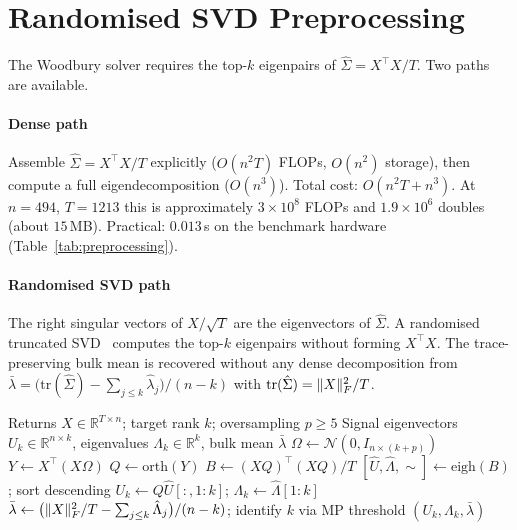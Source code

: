 \section{Randomised SVD Preprocessing}\label{sec:preprocessing}

The Woodbury solver requires the top-$k$ eigenpairs of $\hat\Sigma = X^\top X/T$.
Two paths are available.

\paragraph{Dense path}
Assemble $\hat\Sigma = X^\top X/T$ explicitly ($O(n^2 T)$ FLOPs, $O(n^2)$ storage),
then compute a full eigendecomposition ($O(n^3)$). Total cost: $O(n^2 T + n^3)$.
At $n = 494$, $T = 1213$ this is approximately $3 \times 10^8$ FLOPs and
$1.9 \times 10^6$ doubles (about $15$\,MB). Practical: $0.013$\,s on the benchmark
hardware (Table~\ref{tab:preprocessing}).

\paragraph{Randomised SVD path}
The right singular vectors of $X/\sqrt{T}$ are the eigenvectors of $\hat\Sigma$.
A randomised truncated SVD~\cite{halko2011} computes the top-$k$ eigenpairs
without forming $X^\top X$. The trace-preserving bulk mean is recovered without
any dense decomposition from
$\bar\lambda = \bigl(\mathrm{tr}(\hat\Sigma) - \sum_{j\le k}\hat\lambda_j\bigr)/(n-k)$
with $\mathrm{tr}(\hat\Sigma) = \lVert X \rVert_F^2/T$.

\begin{algorithm}[ht]
\caption{Randomised truncated SVD for eigenpairs of $\hat\Sigma$}\label{alg:rsvd}
\begin{algorithmic}[1]
\Require Returns $X \in \mathbb{R}^{T \times n}$; target rank $k$; oversampling $p \geq 5$
\Ensure  Signal eigenvectors $U_k \in \mathbb{R}^{n \times k}$,
         eigenvalues $\Lambda_k \in \mathbb{R}^k$, bulk mean $\bar\lambda$
\State $\Omega \leftarrow \mathcal{N}(0, I_{n \times (k+p)})$ 
\State $Y \leftarrow X^\top(X \Omega)$ 
\State $Q \leftarrow \mathrm{orth}(Y)$ 
\State $B \leftarrow (XQ)^\top(XQ) / T$ 
\State $[\hat U, \hat\Lambda, \sim] \leftarrow \mathrm{eigh}(B)$; sort descending
\State $U_k \leftarrow Q \hat U[:, 1{:}k]$; $\Lambda_k \leftarrow \hat\Lambda[1{:}k]$
\State $\bar\lambda \leftarrow \bigl(\lVert X \rVert_F^2/T - \textstyle\sum_{j\le k}\hat\Lambda_j\bigr)/(n-k)$; identify $k$ via MP threshold
\State \Return $(U_k, \Lambda_k, \bar\lambda)$
\end{algorithmic}
\end{algorithm}

